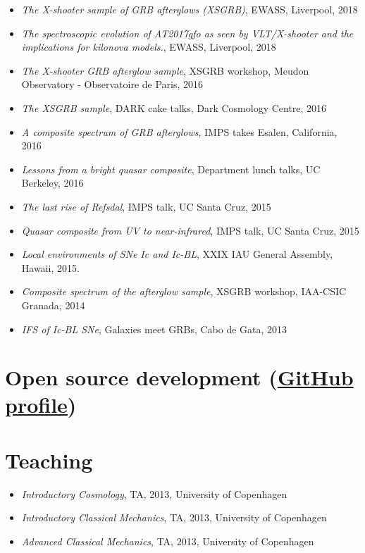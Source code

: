\documentclass[12pt,letterpaper]{article}
\begin{document}
\begin{itemize}
	\item \emph{The X-shooter sample of GRB afterglows (XSGRB)}, EWASS, Liverpool, 2018
	\item \emph{The spectroscopic evolution of AT2017gfo as seen by VLT/X-shooter and the implications for kilonova models.}, EWASS, Liverpool, 2018
    \item \emph{The X-shooter GRB afterglow sample}, XSGRB workshop, Meudon Observatory - Observatoire de Paris, 2016
    \item \emph{The XSGRB sample}, DARK cake talks, Dark Cosmology Centre, 2016
    \item \emph{A composite spectrum of GRB afterglows}, IMPS takes Esalen, California, 2016 
    \item \emph{Lessons from a bright quasar composite}, Department lunch talks, UC Berkeley, 2016 
    \item \emph{The last rise of Refsdal}, IMPS talk, UC Santa Cruz, 2015
    \item \emph{Quasar composite from UV to near-infrared}, IMPS talk, UC Santa Cruz, 2015
    \item \emph{Local environments of SNe Ic and Ic-BL}, XXIX IAU General Assembly, Hawaii, 2015.
    \item \emph{Composite spectrum of the afterglow sample}, XSGRB workshop, IAA-CSIC Granada, 2014
    \item \emph{IFS of Ic-BL SNe}, Galaxies meet GRBs, Cabo de Gata, 2013


\end{itemize}


\section*{Open source development (\href{https://github.com/jselsing}{GitHub profile})}


\section*{Teaching}

\begin{itemize}
	
	\item \emph{Introductory Cosmology}, TA, 2013, University of Copenhagen
    \item \emph{Introductory Classical Mechanics}, TA, 2013, University of Copenhagen
	\item \emph{Advanced Classical Mechanics}, TA, 2013, University of Copenhagen
\end{itemize}
\end{document}
